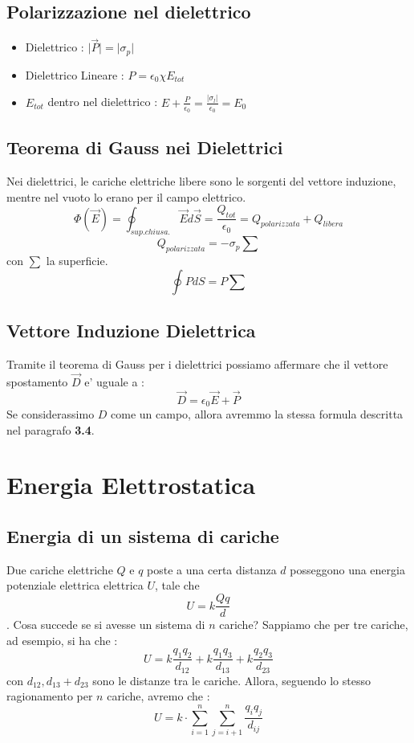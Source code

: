\documentclass[a4paper, 10pt]{article}
\begin{document}
		\subsection{Polarizzazione nel dielettrico}
			\begin{itemize}
				\item Dielettrico : $\vert \overrightarrow{P} \vert = \vert \sigma_p \vert$
				\item Dielettrico Lineare : $P = \epsilon_0 \chi E_{tot}$
				\item $E_{tot}$ dentro nel dielettrico : $E + \frac{P}{\epsilon_0} = \frac{\vert \sigma_l \vert}{\epsilon_0} = E_0$
			\end{itemize}
		\subsection{Teorema di Gauss nei Dielettrici}
			Nei dielettrici, le cariche elettriche libere sono le sorgenti del vettore induzione, mentre nel 
			vuoto lo erano per il campo elettrico.
			\[ 
				\Phi(\overrightarrow{E}) = \oint_{sup.chiusa.} \overrightarrow{E}d\overrightarrow{S} = \frac{Q_{tot}}{\epsilon_0} =
				Q_{polarizzata} + Q_{libera}
			\]
			\[ Q_{polarizzata} = -\sigma_p \sum\]con $\sum$ la superficie.
			\[ \oint PdS = P \sum \]
		\subsection{Vettore Induzione Dielettrica}
			Tramite il teorema di Gauss per i dielettrici possiamo affermare che il vettore spostamento $\overrightarrow{D}$ 
			e' uguale a :
			\[ \overrightarrow{D} = \epsilon_0 \overrightarrow{E} + \overrightarrow{P} \]
			Se considerassimo $D$ come un campo, allora avremmo la stessa formula descritta nel paragrafo \textbf{3.4}.
	
	\newpage
	\section{Energia Elettrostatica}
		\subsection{Energia di un sistema di cariche}
			Due cariche elettriche $Q$ e $q$ poste a una certa distanza $d$ posseggono una energia potenziale elettrica
			elettrica $U$, tale che \[ U = k \frac{Qq}{d} \]. Cosa succede se si avesse un sistema di $n$ cariche?
			Sappiamo che per tre cariche, ad esempio, si ha che :
			\[ U = k \frac{q_1 q_2}{d_{12}} + k \frac{q_1 q_3}{d_{13}} + k \frac{q_2 q_3}{d_{23}} \]
			con $d_{12}, d_{13} + d_{23}$ sono le distanze tra le cariche. Allora, seguendo lo stesso ragionamento 
			per $n$ cariche, avremo che :
			\[ U = k \cdot \sum_{i = 1}^n \sum_{j = i + 1}^n  \frac{q_i q_j}{d_{ij}} \]
\end{document}
